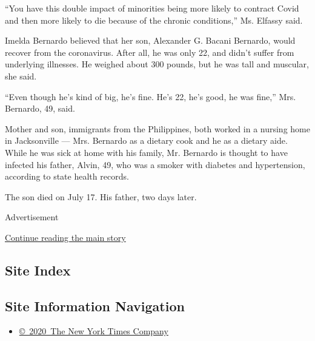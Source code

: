 ``You have this double impact of minorities being more likely to
contract Covid and then more likely to die because of the chronic
conditions,'' Ms. Elfassy said.

Imelda Bernardo believed that her son, Alexander G. Bacani Bernardo,
would recover from the coronavirus. After all, he was only 22, and
didn't suffer from underlying illnesses. He weighed about 300 pounds,
but he was tall and muscular, she said.

``Even though he's kind of big, he's fine. He's 22, he's good, he was
fine,'' Mrs. Bernardo, 49, said.

Mother and son, immigrants from the Philippines, both worked in a
nursing home in Jacksonville --- Mrs. Bernardo as a dietary cook and he
as a dietary aide. While he was sick at home with his family, Mr.
Bernardo is thought to have infected his father, Alvin, 49, who was a
smoker with diabetes and hypertension, according to state health
records.

The son died on July 17. His father, two days later.

Advertisement

\protect\hyperlink{after-bottom}{Continue reading the main story}

\hypertarget{site-index}{%
\subsection{Site Index}\label{site-index}}

\hypertarget{site-information-navigation}{%
\subsection{Site Information
Navigation}\label{site-information-navigation}}

\begin{itemize}
\tightlist
\item
  \href{https://help.nytimes3xbfgragh.onion/hc/en-us/articles/115014792127-Copyright-notice}{©~2020~The
  New York Times Company}
\end{itemize}

